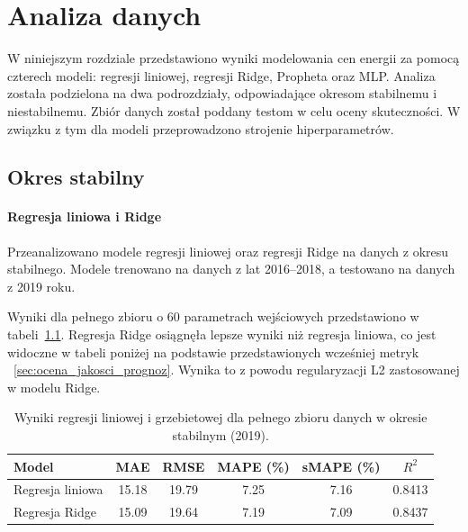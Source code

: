 \chapter{Analiza danych}
\label{ch:analiza}

W niniejszym rozdziale przedstawiono wyniki modelowania cen energii za pomocą czterech modeli: regresji liniowej, regresji Ridge, Propheta oraz MLP. Analiza została podzielona na dwa podrozdziały, odpowiadające okresom stabilnemu i niestabilnemu. Zbiór danych został poddany testom w celu oceny skuteczności. W związku z tym dla modeli przeprowadzono strojenie hiperparametrów. 

\section{Okres stabilny}
\label{sec:okres_stabilny}

\subsubsection{Regresja liniowa i Ridge}

Przeanalizowano modele regresji liniowej oraz regresji Ridge na danych z okresu stabilnego. Modele trenowano na danych z lat 2016--2018, a testowano na danych z 2019 roku.

Wyniki dla pełnego zbioru o 60 parametrach wejściowych przedstawiono w tabeli~\ref{tab:linear_ridge_results_full}. Regresja Ridge osiągnęła lepsze wyniki niż regresja liniowa, co jest widoczne w tabeli poniżej na podstawie przedstawionych wcześniej metryk ~\ref{sec:ocena_jakosci_prognoz}. Wynika to z powodu regularyzacji L2 zastosowanej w modelu Ridge. 

\begin{table}[H]
    \centering
    \caption{Wyniki regresji liniowej i grzebietowej dla pełnego zbioru danych w okresie stabilnym (2019).}
    \label{tab:linear_ridge_results_full}
    \begin{tabular}{|l|ccccc|}
        \hline
        \textbf{Model} & \textbf{MAE} & \textbf{RMSE} & \textbf{MAPE (\%)} & \textbf{sMAPE (\%)} & \textbf{\(R^2\)} \\
        \hline
        Regresja liniowa & 15.18 & 19.79 & 7.25 & 7.16 & 0.8413 \\
        Regresja Ridge   & 15.09 & 19.64 & 7.19 & 7.09 & 0.8437 \\
        \hline
    \end{tabular}
\end{table}

